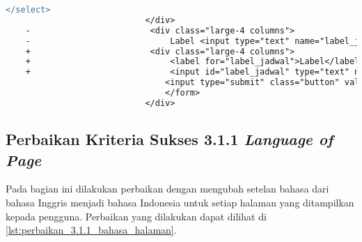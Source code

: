 \begin{lstlisting}[frame=single, label={lst:perbaikan_2.5.3_label_dan_nama_pada_komponen_masukan}, language=diff, caption=Perbaikan Kriteria Sukses 2.5.3 - Label dan Nama Pada Komponen Masukan]
                                </select>
                            </div>
    -                        <div class="large-4 columns">
    -                            Label <input type="text" name="label_jadwal"><br>
    +                        <div class="large-4 columns">   
    +                            <label for="label_jadwal">Label</label>
    +                            <input id="label_jadwal" type="text" name="label_jadwal"><br>
                                <input type="submit" class="button" value="Tambah">
                                </form>
                            </div>
\end{lstlisting} 

\subsection{Perbaikan Kriteria Sukses 3.1.1 \textit{Language of Page}}
\label{subsec:perbaikan_kriteria_sukses_3.1.1}
Pada bagian ini dilakukan perbaikan dengan mengubah setelan bahasa dari bahasa Inggris menjadi bahasa Indonesia untuk setiap halaman yang ditampilkan kepada pengguna. Perbaikan yang dilakukan dapat dilihat di \ref{lst:perbaikan_3.1.1_bahasa_halaman}.

